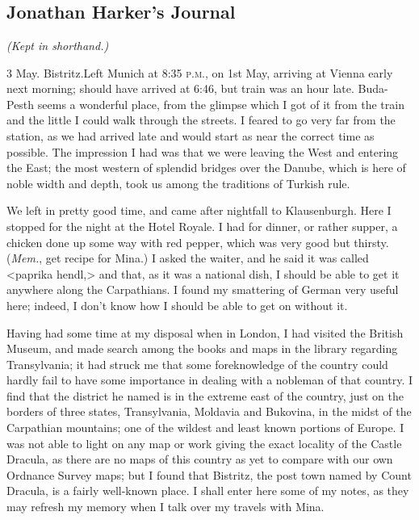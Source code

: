 \chapter[Chapter \thechapter]{}

\section{Jonathan Harker's Journal}

\begin{center}
	\textit{(Kept in shorthand.)}
	\end{center}

\begin{diary}{3 May. Bistritz.}Left Munich at 8:35 \textsc{p.m.}, on 1st May, arriving at Vienna early next morning; should have arrived at 6:46, but train was an hour late. Buda-Pesth seems a wonderful place, from the glimpse which I got of it from the train and the little I could walk through the streets. I feared to go very far from the station, as we had arrived late and would start as near the correct time as possible. The impression I had was that we were leaving the West and entering the East; the most western of splendid bridges over the Danube, which is here of noble width and depth, took us among the traditions of Turkish rule.

We left in pretty good time, and came after nightfall to Klausenburgh. Here I stopped for the night at the Hotel Royale. I had for dinner, or rather supper, a chicken done up some way with red pepper, which was very good but thirsty. (\textit{Mem.}, get recipe for Mina.) I asked the waiter, and he said it was called <paprika hendl,> and that, as it was a national dish, I should be able to get it anywhere along the Carpathians. I found my smattering of German very useful here; indeed, I don't know how I should be able to get on without it.

Having had some time at my disposal when in London, I had visited the British Museum, and made search among the books and maps in the library regarding Transylvania; it had struck me that some foreknowledge of the country could hardly fail to have some importance in dealing with a nobleman of that country. I find that the district he named is in the extreme east of the country, just on the borders of three states, Transylvania, Moldavia and Bukovina, in the midst of the Carpathian mountains; one of the wildest and least known portions of Europe. I was not able to light on any map or work giving the exact locality of the Castle Dracula, as there are no maps of this country as yet to compare with our own Ordnance Survey maps; but I found that Bistritz, the post town named by Count Dracula, is a fairly well-known place. I shall enter here some of my notes, as they may refresh my memory when I talk over my travels with Mina.


\end{diary}
